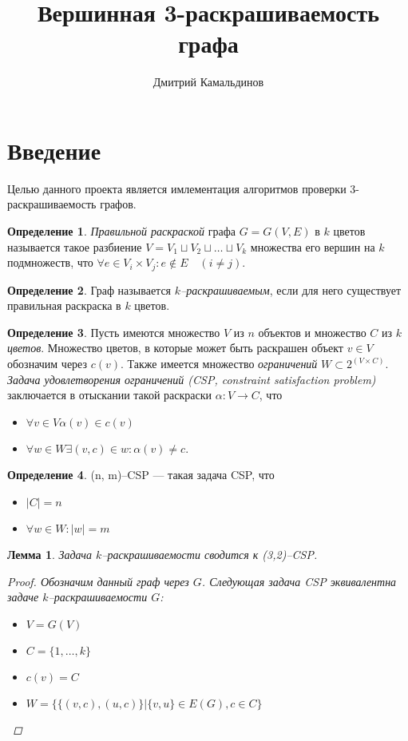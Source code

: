 \documentclass[fleqn]{article}
\author{Дмитрий Камальдинов}
\date{}
\title{Вершинная 3-раскрашиваемость графа}
\theoremstyle{plain}
\theoremstyle{plain}
\theoremstyle{plain}
\newtheorem{lemma}{Лемма}
\theoremstyle{definition}
\newtheorem{defin}{Определение}
\begin{document}
\maketitle

\section{Введение}
Целью данного проекта является имлементация алгоритмов проверки 3-раскрашиваемость графов.

\begin{defin}
	\emph{Правильной раскраской} графа $G = G(V,E)$ в $k$ цветов называется такое разбиение 
	$V = V_1 \sqcup V_2 \sqcup \dots \sqcup V_k$ множества его вершин на $k$ подмножеств, что 
	$\forall e \in V_i \times V_j : e \not\in E \quad (i \not= j)$.
\end{defin}

\begin{defin}
	Граф называется \emph{$k$--раскрашиваемым}, если для него существует правильная раскраска в $k$ цветов.
\end{defin}

\begin{defin} Пусть имеются множество $V$ из $n$ объектов и 
множество $C$ из $k$ \emph{цветов}. Множество цветов, в которые может быть раскрашен объект $v \in V$ обозначим через $c(v)$. Также имеется множество \emph{ограничений} $W \subset 2^{(V \times C)}$. \emph{Задача удовлетворения ограничений (CSP, constraint satisfaction problem)} заключается в отыскании такой раскраски $\alpha : V \rightarrow C$, что
\begin{itemize}
	\item $\forall v \in V \alpha(v) \in c(v)$
	\item $\forall w \in W \exists (v, c) \in w : \alpha(v) \not= c $.
\end{itemize}
\end{defin}

\begin{defin}
	(n, m)--CSP --- такая задача CSP, что
	\begin{itemize}
		\item $|C| = n$
		\item $\forall w \in W : |w| = m$
	\end{itemize}
\end{defin}

\begin{lemma}
	Задача $k$--раскрашиваемости сводится к (3,2)--CSP.
	\begin{proof}
		Обозначим данный граф через $G$. Следующая задача CSP эквивалентна задаче $k$--раскрашиваемости $G$:
		\begin{itemize}
			\item $V = G(V)$
			\item $C = \{1, \dots, k\}$
			\item $c(v) = C$
			\item $W = \{\{(v, c), (u, c)\} | \{v, u\} \in E(G), c \in C\}$
		\end{itemize}
	\end{proof}
\end{lemma}
\end{document}
